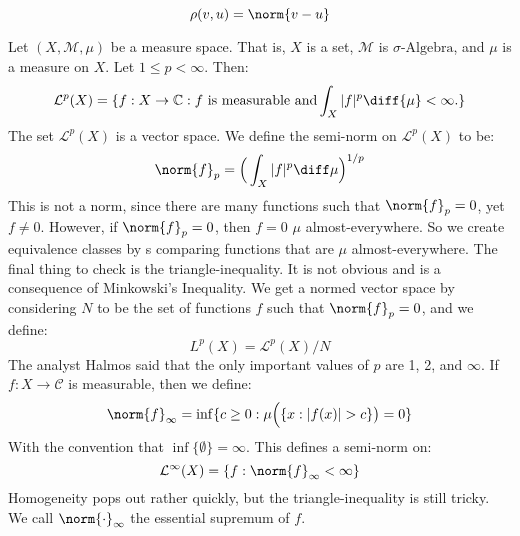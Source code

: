 \documentclass[crop=false,class=book,oneside]{standalone}                      %
\begin{document}
            \begin{equation}
                \rho(v,u)=\norm{v-u}
            \end{equation}
            \begin{lexample}
                Let $(X,\mathcal{M},\mu)$ be a measure space.
                That is, $X$ is a set, $\mathcal{M}$ is
                $\sigma\textrm{-Algebra}$, and $\mu$ is a measure
                on $X$. Let $1\leq{p}<\infty$. Then:
                \begin{equation}
                    \mathcal{L}^{p}(X)=
                    \{f:X\rightarrow\mathbb{C}:
                    f\textrm{ is measurable and}
                    \int_{X}|f|^{p}\diff{\mu}<\infty.\}
                \end{equation}
                The set $\mathcal{L}^{p}(X)$ is a vector space.
                We define the semi-norm on $\mathcal{L}^{p}(X)$
                to be:
                \begin{equation}
                    \norm{f}_{p}=
                    \Big(\int_{X}|f|^{p}\diff\mu\Big)^{1/p}
                \end{equation}
                This is not a norm, since there are many
                functions such that $\norm{f}_{p}=0$, yet $f\ne{0}$.
                However, if $\norm{f}_{p}=0$, then $f=0$ $\mu$
                almost-everywhere. So we create equivalence
                classes by s comparing functions that are $\mu$
                almost-everywhere. The final thing to check is
                the triangle-inequality. It is not obvious and is a
                consequence of Minkowski's Inequality. We get
                a normed vector space by considering $N$ to be
                the set of functions $f$ such that $\norm{f}_{p}=0$,
                and we define:
                \begin{equation}
                    L^{p}(X)=\mathcal{L}^{p}(X)/N
                \end{equation}
                The analyst Halmos said that the only important
                values of $p$ are 1, 2, and $\infty$. If
                $f:X\rightarrow\mathcal{C}$ is
                measurable, then we define:
                \begin{equation}
                    \norm{f}_{\infty}=
                    \inf\{c\geq{0}:\mu\Big(\{x:|f(x)|>c\}\big)=0\}
                \end{equation}
                With the convention that $\inf\{\emptyset\}=\infty$.
                This defines a semi-norm on:
                \begin{equation}
                    \mathcal{L}^{\infty}(X)
                    =\{f:\norm{f}_{\infty}<\infty\}
                \end{equation}
                Homogeneity pops out rather quickly, but the
                triangle-inequality is still tricky. We call
                $\norm{\cdot}_{\infty}$ the essential supremum
                of $f$.
            \end{lexample}
\end{document}
